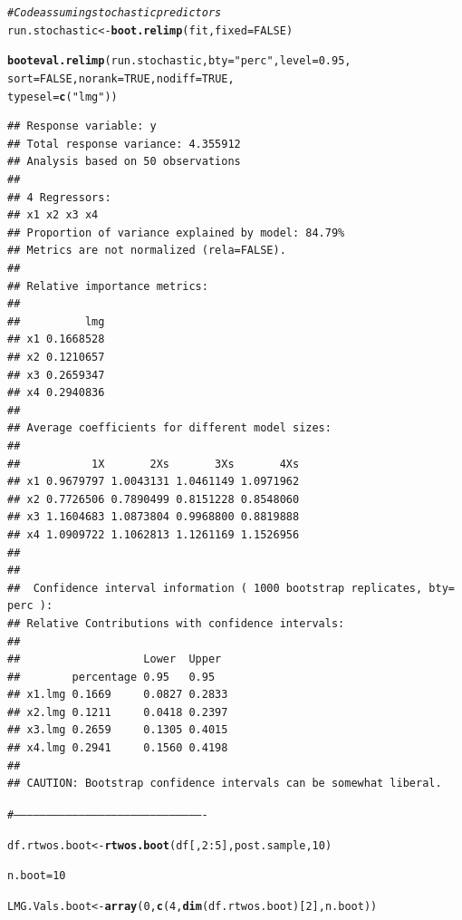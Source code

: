 \documentclass[11pt,a4paper,twoside]{book}\usepackage[]{graphicx}\usepackage[]{color}
\makeatletter
\newcommand{\hlnum}[1]{\textcolor[rgb]{0.686,0.059,0.569}{#1}}%
\newcommand{\hlstr}[1]{\textcolor[rgb]{0.192,0.494,0.8}{#1}}%
\newcommand{\hlcom}[1]{\textcolor[rgb]{0.678,0.584,0.686}{\textit{#1}}}%
\newcommand{\hlopt}[1]{\textcolor[rgb]{0,0,0}{#1}}%
\newcommand{\hlstd}[1]{\textcolor[rgb]{0.345,0.345,0.345}{#1}}%
\newcommand{\hlkwb}[1]{\textcolor[rgb]{0.69,0.353,0.396}{#1}}%
\newcommand{\hlkwc}[1]{\textcolor[rgb]{0.333,0.667,0.333}{#1}}%
\newcommand{\hlkwd}[1]{\textcolor[rgb]{0.737,0.353,0.396}{\textbf{#1}}}%
\newenvironment{kframe}{%
 \def\at@end@of@kframe{}%
 \ifinner\ifhmode%
  \def\at@end@of@kframe{\end{minipage}}%
  \begin{minipage}{\columnwidth}%
 \fi\fi%
 \def\FrameCommand##1{\hskip\@totalleftmargin \hskip-\fboxsep
 \colorbox{shadecolor}{##1}\hskip-\fboxsep
     \hskip-\linewidth \hskip-\@totalleftmargin \hskip\columnwidth}%
 \MakeFramed {\advance\hsize-\width
   \@totalleftmargin\z@ \linewidth\hsize
   \@setminipage}}%
 {\par\unskip\endMakeFramed%
 \at@end@of@kframe}
\newenvironment{knitrout}{}{} %
\makeatother
\begin{document}
\begin{knitrout}
\color{fgcolor}\begin{kframe}
\begin{alltt}
\hlcom{#Code assuming stochastic predictors}
\hlstd{run.stochastic}\hlkwb{<-}\hlkwd{boot.relimp}\hlstd{(fit,} \hlkwc{fixed}\hlstd{=}\hlnum{FALSE}\hlstd{)}

\hlkwd{booteval.relimp}\hlstd{(run.stochastic,} \hlkwc{bty} \hlstd{=} \hlstr{"perc"}\hlstd{,} \hlkwc{level} \hlstd{=} \hlnum{0.95}\hlstd{,}
                \hlkwc{sort} \hlstd{=} \hlnum{FALSE}\hlstd{,} \hlkwc{norank} \hlstd{=} \hlnum{TRUE}\hlstd{,} \hlkwc{nodiff} \hlstd{=} \hlnum{TRUE}\hlstd{,}
                \hlkwc{typesel} \hlstd{=} \hlkwd{c}\hlstd{(}\hlstr{"lmg"}\hlstd{))}
\end{alltt}
\begin{verbatim}
## Response variable: y 
## Total response variance: 4.355912 
## Analysis based on 50 observations 
## 
## 4 Regressors: 
## x1 x2 x3 x4 
## Proportion of variance explained by model: 84.79%
## Metrics are not normalized (rela=FALSE). 
## 
## Relative importance metrics: 
## 
##          lmg
## x1 0.1668528
## x2 0.1210657
## x3 0.2659347
## x4 0.2940836
## 
## Average coefficients for different model sizes: 
## 
##           1X       2Xs       3Xs       4Xs
## x1 0.9679797 1.0043131 1.0461149 1.0971962
## x2 0.7726506 0.7890499 0.8151228 0.8548060
## x3 1.1604683 1.0873804 0.9968800 0.8819888
## x4 1.0909722 1.1062813 1.1261169 1.1526956
## 
##  
##  Confidence interval information ( 1000 bootstrap replicates, bty= perc ): 
## Relative Contributions with confidence intervals: 
##  
##                   Lower  Upper
##        percentage 0.95   0.95  
## x1.lmg 0.1669     0.0827 0.2833
## x2.lmg 0.1211     0.0418 0.2397
## x3.lmg 0.2659     0.1305 0.4015
## x4.lmg 0.2941     0.1560 0.4198
## 
## CAUTION: Bootstrap confidence intervals can be somewhat liberal.
\end{verbatim}
\begin{alltt}
\hlcom{#----------------------------------------------------------------------------------------}


\hlstd{df.rtwos.boot} \hlkwb{<-}\hlkwd{rtwos.boot}\hlstd{(df[,}\hlnum{2}\hlopt{:}\hlnum{5}\hlstd{], post.sample,} \hlnum{10}\hlstd{)}

\hlstd{n.boot} \hlkwb{=} \hlnum{10}

\hlstd{LMG.Vals.boot}\hlkwb{<-}\hlkwd{array}\hlstd{(}\hlnum{0}\hlstd{,} \hlkwd{c}\hlstd{(}\hlnum{4}\hlstd{,}\hlkwd{dim}\hlstd{(df.rtwos.boot)[}\hlnum{2}\hlstd{], n.boot))}


\end{alltt}
\end{kframe}
\end{knitrout}
\end{document}
